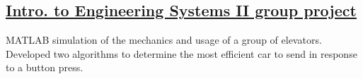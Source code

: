 \documentclass[letterpaper]{article}
\begin{document}
\begin{minipage}[t]{\dimexpr.67\textwidth-.5\columnsep}
\subsection{\href{https://github.com/player13245/elevator-control}{Intro. to Engineering Systems II group project}}
MATLAB simulation of the mechanics and usage of a group of elevators. Developed two algorithms to determine the most efficient car to send in response to a button press.

\end{minipage}
\end{document}

